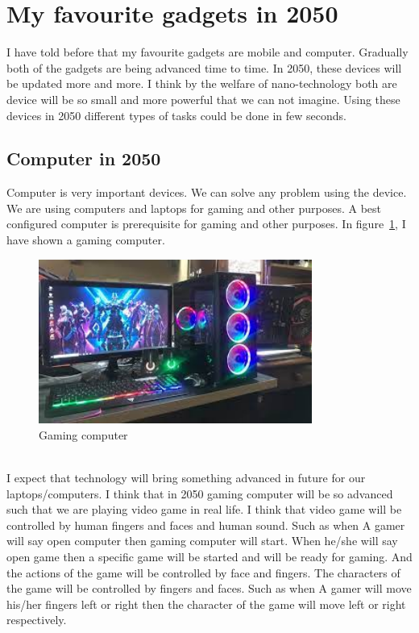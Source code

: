 \section{My favourite gadgets in 2050}
I have told before that my favourite gadgets are mobile and computer. Gradually both of the gadgets are being advanced time to time. In 2050, these devices will be updated more and more. I think by the welfare of nano-technology both are device will be so small and more powerful that we can not imagine. Using these devices in 2050 different types of tasks could be done in few seconds.
\subsection{Computer in 2050}
Computer is very important devices. We can solve any problem using the device. We are using computers and laptops for gaming and other purposes. A best configured computer is prerequisite for gaming and other purposes. In figure~\ref{fig:fig6}, I have shown a gaming computer.
\begin{figure}[h]
    \centering
    \includegraphics[width = 0.8\textwidth]{pic/gaming.jpeg}
    \caption{Gaming computer}
    \label{fig:fig6}
\end{figure}\\
 I expect that technology will bring something advanced in future for our laptops/computers. I think that in 2050 gaming computer will be so advanced such that we are playing video game in real life. I think that video game will be controlled by human fingers and faces and human sound. Such as when A gamer will say open computer then gaming computer will start. When he/she will say open game then a specific game will be started  and will be ready for gaming. And the actions of the game will be controlled by face and fingers. The characters of the game will be controlled by fingers and faces. Such as when A gamer will move his/her fingers left or right then the character of the game will move left or right respectively.\\

